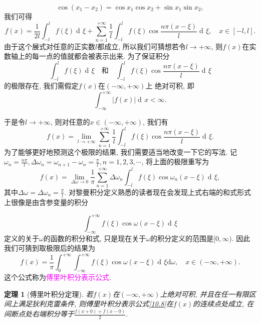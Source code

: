 \documentclass[aspectratio=169,notheorems,12pt,compress,UTF8]{ctexbeamer} %
\DeclareMathOperator\dif{d\!}
\def\dfrac{\displaystyle\frac}
\newtheorem{theorem}{定理}
\begin{document}
\begin{frame}
\vspace{-5mm}
$$
\cos(x_1-x_2)=\cos x_1\cos x_2+\sin x_1\sin x_2,
$$
我们可得
$$
f(x)=\frac{1}{2l}\int_{-l}^l f(\xi)\dif\xi+\sum_{n=1}^{+\infty}
\frac{1}{l}\int_{-l}^l f(\xi)\cos\frac{n\pi (x-\xi)}{l}\dif\xi,\quad x\in [-l,l].
$$\pause
由于这个展式对任意的正实数$l$都成立, 所以我们可猜想若令$l\to+\infty$,
则$f(x)$在实数轴上的每一点的值就都会被表示出来. \pause 为了保证积分
\begin{equation*}
\int_{-l}^l f(\xi)\dif\xi \quad \text{和}\quad \int_{-l}^l f(\xi)\cos\frac{n\pi (x-\xi)}{l}\dif\xi
\end{equation*}
的极限存在, 我们需假定$f(x)$在$(-\infty,+\infty)$上
绝对可积, 即
$$
\int_{-\infty}^{+\infty} |f(x)|\dif x<\infty.
$$
\end{frame}

\begin{frame}
于是令$l\rightarrow+\infty$, 则对任意的$x\in(-\infty,+\infty)$,  我们有
$$
f(x)=\lim_{l\rightarrow+\infty}\sum_{n=1}^{+\infty}
\frac{1}{l}\int_{-l}^l f(\xi)\cos\frac{n\pi (x-\xi)}{l}\dif\xi.
$$\pause
为了能够更好地预测这个极限的结果, 我们需要适当地改变一下它的写法. 记$\omega_n=\dfrac{n\pi}{l},\Delta\omega_n=\omega_{n+1}-\omega_n=\dfrac{\pi}{l},n=1,2,3,\cdots$,
将上面的极限重写为
$$
f(x)=\lim_{\Delta\omega\rightarrow 0}\frac{1}{\pi}\sum_{n=1}^{+\infty}
\Delta\omega_n\int_{-l}^l f(\xi)\cos\omega_n(x-\xi)\dif\xi,
$$
其中$\Delta\omega=\Delta\omega_n=\dfrac{\pi}{l}$. \pause 对黎曼积分定义熟悉的读者现在会发现上式右端的和式形式上很像是由含参变量的积分
\end{frame}

\begin{frame}
\vspace{-5mm}
$$
\int_{-\infty}^{+\infty} f(\xi)\cos\omega(x-\xi)\dif\xi
$$
定义的关于$\omega$的函数的积分和式, 只是现在关于$\omega$的积分定义的范围是$[0,\infty)$. \pause 因此我们可猜到取极限后的结果为
\begin{equation}\label{10.8}
f(x)=\frac{1}{\pi}\int_0^{+\infty}\!\!\!\!\int_{-\infty}^{+\infty}
f(\xi)\cos\omega(x-\xi)\dif\xi \mathrm{d}\omega,\quad x\in (-\infty,+\infty).
\end{equation}
这个公式称为\textcolor{magenta}{傅里叶积分表示公式}. \pause

\begin{theorem}[傅里叶积分定理]\label{T10.1}
若$f(x)$在$(-\infty,+\infty)$上绝对可积, 并且在任一有限区间上满足狄利克雷条件,
则傅里叶积分表示公式\eqref{10.8}在$f(x)$的连续点处成立, 在间断点处右端积分等于$\dfrac{f(x+0)+f(x-0)}{2}$.
\end{theorem}
\end{frame}
\end{document}
